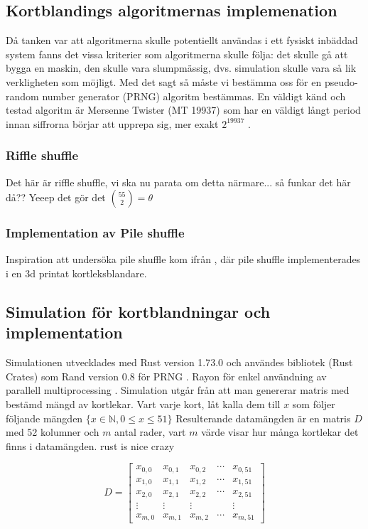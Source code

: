 \documentclass[swedish,a4paper]{article}
\begin{document}
\subsection{Kortblandings algoritmernas implemenation}

Då tanken var att  algoritmerna skulle potentiellt användas i ett fysiskt
inbäddad system fanns det vissa  kriterier som algoritmerna skulle följa: det
skulle gå att bygga en maskin, den skulle vara slumpmässig, dvs. simulation
skulle vara så lik verkligheten som möjligt. Med det sagt så måste vi bestämma
oss för en pseudo-random number generator (PRNG) algoritm bestämmas. En väldigt
känd och testad algoritm är Mersenne Twister (MT 19937) som har en väldigt långt
period innan siffrorna börjar att upprepa sig, mer exakt $2^{19937}$ \parencite{mersenne_twister}.

\subsubsection{Riffle shuffle}
Det här är riffle shuffle, vi ska nu parata om detta närmare...
så funkar det här då?? Yeeep det gör det $\binom{55}{2} = \theta$

\subsubsection{Implementation av Pile shuffle}
Inspiration att undersöka pile shuffle kom ifrån \textcite{3DprintedLife2021},
där pile shuffle implementerades i en 3d printat kortleksblandare.  

\subsection{Simulation för kortblandningar och implementation}

Simulationen utvecklades med Rust version 1.73.0 och användes bibliotek (Rust
Crates) som Rand version 0.8 för PRNG \parencite{rand_crate}. Rayon för enkel
användning av  parallell multiprocessing \parencite{rayon_crate}. Simulation
utgår från att man genererar matris med bestämd mängd av kortlekar. Vart varje
kort, låt kalla dem till $x$ som följer följande mängden $\{x \in \mathbb{N},  0 \leq x \leq 51 \}$
Resulterande datamängden är en matris $D$ med 52 kolumner och $m$ antal rader, vart
$m$ värde visar hur många kortlekar det finns i datamängden.
rust is nice crazy

\begin{equation*}
	D = \begin{bmatrix}
		x_{0,0} & x_{0,1} & x_{0,2} & \cdots & x_{0,51}\\ 
		x_{1,0} & x_{1,1} & x_{1,2} & \cdots & x_{1,51}\\
		x_{2,0} & x_{2,1} & x_{2,2} & \cdots & x_{2,51}\\
		\vdots & \vdots & \vdots & \; & \vdots \\
		x_{m,0} & x_{m,1} & x_{m,2} & \cdots & x_{m,51}
	\end{bmatrix}
\end{equation*}
\end{document}
